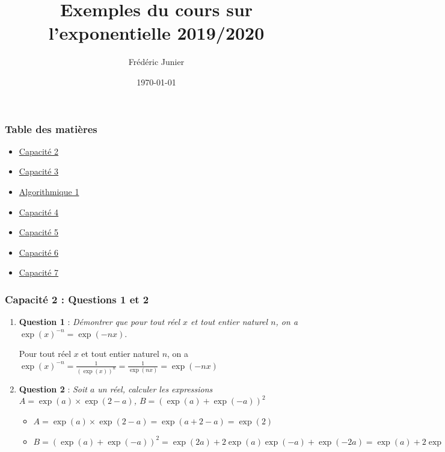 \documentclass[11pt, hyperref={urlcolor=red,%
            linkcolor=blue, %
            colorlinks=true}]{beamer}
\title[exponentielle]{Exemples du cours sur l'exponentielle 2019/2020}
\author[F.Junier]{Fr\'ed\'eric Junier}
\institute[Le Parc]{{\centering Lyc\'ee du Parc \\
1 Boulevard Anatole France \\ 69006 Lyon }}
\date[\today]{\today}
\begin{document}
\frame{\titlepage}




\begin{frame}
\frametitle{Table des matières}
\begin{itemize}
	\item \hyperlink{capacite2}{Capacité 2}
    \item \hyperlink{capacite3}{Capacité 3}
    \item \hyperlink{algo1}{Algorithmique 1}
    \item \hyperlink{capacite4}{Capacité 4}
    \item \hyperlink{capacite5}{Capacité 5}
    \item \hyperlink{capacite6}{Capacité 6}
    \item \hyperlink{capacite7}{Capacité 7}
\end{itemize}

\end{frame}

\begin{frame}
\frametitle{Capacité 2 : Questions 1 et 2}
\label{capacite2}
\begin{enumerate}
    \item \textbf{Question 1} : \textit{Démontrer que pour tout réel $x$ et  tout entier naturel $n$, on a $\exp(x)^{-n}=\exp(-nx)$}.
    
 Pour tout réel $x$  et  tout entier naturel $n$, on a $\exp(x)^{-n}=\frac{1}{\left(\exp(x)\right)^{n}}= \frac{1}{\exp(nx)}=\exp(-nx)$
 
 
	\item \textbf{Question 2} : {\itshape Soit $a$ un réel, calculer les expressions $A=\exp(a) \times \exp(2-a)$, $B=\left(\exp(a)+\exp(-a)\right)^{2}$ }
	
	\begin{itemize}
\item $A=\exp(a) \times \exp(2-a)=\exp(a+2-a)=\exp(2)$
\item $B=\left(\exp(a)+\exp(-a)\right)^{2}=\exp(2a)+2\exp(a)\exp(-a)+\exp(-2a)=\exp(a)+2\exp(0)+\exp(-a)=\exp(a)+\exp(-a)+2$
		
	\end{itemize}
	
	

\end{enumerate}
\end{frame}
\end{document}
